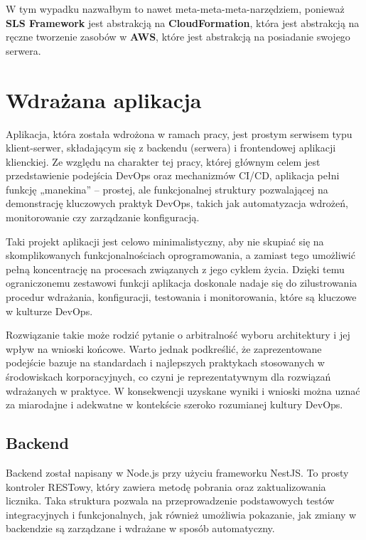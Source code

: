 \documentclass{article}
\begin{document}
W tym wypadku nazwałbym to nawet meta-meta-meta-narzędziem, ponieważ \textbf{SLS Framework} jest abstrakcją na \textbf{CloudFormation}, która jest abstrakcją na ręczne tworzenie zasobów w \textbf{AWS}, które jest abstrakcją na posiadanie swojego serwera.



\section{Wdrażana aplikacja}

Aplikacja, która została wdrożona w ramach pracy, jest prostym serwisem typu klient-serwer, składającym się z backendu (serwera) i frontendowej aplikacji klienckiej. Ze względu na charakter tej pracy, której głównym celem jest przedstawienie podejścia DevOps oraz mechanizmów CI/CD, aplikacja pełni funkcję „manekina” – prostej, ale funkcjonalnej struktury pozwalającej na demonstrację kluczowych praktyk DevOps, takich jak automatyzacja wdrożeń, monitorowanie czy zarządzanie konfiguracją.

Taki projekt aplikacji jest celowo minimalistyczny, aby nie skupiać się na skomplikowanych funkcjonalnościach oprogramowania, a zamiast tego umożliwić pełną koncentrację na procesach związanych z jego cyklem życia. Dzięki temu ograniczonemu zestawowi funkcji aplikacja doskonale nadaje się do zilustrowania procedur wdrażania, konfiguracji, testowania i monitorowania, które są kluczowe w kulturze DevOps.

Rozwiązanie takie może rodzić pytanie o arbitralność wyboru architektury i jej wpływ na wnioski końcowe. Warto jednak podkreślić, że zaprezentowane podejście bazuje na standardach i najlepszych praktykach stosowanych w środowiskach korporacyjnych, co czyni je reprezentatywnym dla rozwiązań wdrażanych w praktyce. W konsekwencji uzyskane wyniki i wnioski można uznać za miarodajne i adekwatne w kontekście szeroko rozumianej kultury DevOps.

\subsection{Backend}

Backend został napisany w Node.js przy użyciu frameworku NestJS. To prosty kontroler RESTowy, który zawiera metodę pobrania oraz zaktualizowania licznika. Taka struktura pozwala na przeprowadzenie podstawowych testów integracyjnych i funkcjonalnych, jak również umożliwia pokazanie, jak zmiany w backendzie są zarządzane i wdrażane w sposób automatyczny.
\end{document}

